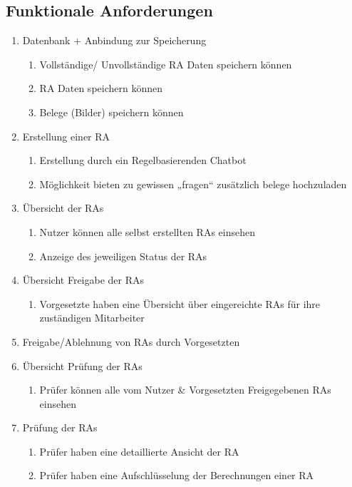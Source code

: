 \subsection{Funktionale Anforderungen}
\begin{enumerate}[label*=\arabic*.]
	\item Datenbank + Anbindung zur Speicherung
	\begin{enumerate}[label*=\arabic*.]
		\item Vollständige/ Unvollständige RA Daten speichern können
		\item RA Daten speichern können
		\item Belege (Bilder) speichern können
	\end{enumerate}
	\item Erstellung einer RA
	\begin{enumerate}[label*=\arabic*.]
		\item Erstellung durch ein Regelbasierenden Chatbot
		\item Möglichkeit bieten zu gewissen „fragen“ zusätzlich belege hochzuladen
	\end{enumerate}
	\item Übersicht der RAs
	\begin{enumerate}[label*=\arabic*.]
		\item Nutzer können alle selbst erstellten RAs einsehen
		\item Anzeige des jeweiligen Status der RAs
	\end{enumerate}
	\item Übersicht Freigabe der RAs
	\begin{enumerate}[label*=\arabic*.]
		\item Vorgesetzte haben eine Übersicht über eingereichte RAs für ihre zuständigen Mitarbeiter
	\end{enumerate}
	\item Freigabe/Ablehnung von RAs durch Vorgesetzten
	\item Übersicht Prüfung der RAs
	\begin{enumerate}[label*=\arabic*.]
		\item Prüfer können alle vom Nutzer & Vorgesetzten Freigegebenen RAs einsehen
	\end{enumerate}
	\item Prüfung der RAs
	\begin{enumerate}[label*=\arabic*.]
		\item Prüfer haben eine detaillierte Ansicht der RA
		\item Prüfer haben eine Aufschlüsselung der Berechnungen einer RA

\end{enumerate}
\end{enumerate}

